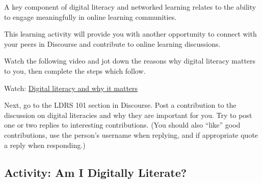 \documentclass[
]{book}
\theoremstyle{definition}
\theoremstyle{definition}
\theoremstyle{definition}
\theoremstyle{definition}
\theoremstyle{remark}
\begin{document}
\begin{reflect}
A key component of digital literacy and networked learning relates to the ability to engage meaningfully in online learning communities.

This learning activity will provide you with another opportunity to connect with your peers in Discourse and contribute to online learning discussions.

Watch the following video and jot down the reasons why digital literacy matters to you, then complete the steps which follow.

Watch: \href{https://www.youtube.com/watch?v=p2k3C-iB88w}{Digital literacy and why it matters}

Next, go to the LDRS 101 section in Discourse. Post a contribution to the discussion on digital literacies and why they are important for you. Try to post one or two replies to interesting contributions. (You should also ``like'' good contributions, use the person's username when replying, and if appropriate quote a reply when responding.)
\end{reflect}

\hypertarget{activity-am-i-digitally-literate}{%
\subsection*{Activity: Am I Digitally Literate?}\label{activity-am-i-digitally-literate}}
\end{document}
